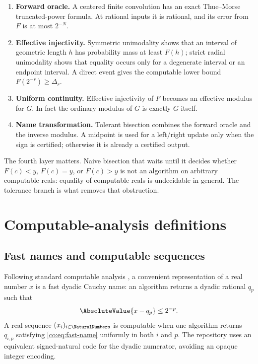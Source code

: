 \begin{enumerate}
\item \textbf{Forward oracle.}  A centered finite convolution has an exact
Thue--Morse truncated-power formula.  At rational inputs it is rational, and
its error from $F$ is at most $2^{-N}$.
\item \textbf{Effective injectivity.}  Symmetric unimodality shows that an
interval of geometric length $h$ has probability mass at least $F(h)$;
strict radial unimodality shows that equality occurs only for a degenerate
interval or an endpoint interval.
A direct event gives the computable lower bound $F(2^{-r})\ge\Delta_r$.
\item \textbf{Uniform continuity.}  Effective injectivity of $F$ becomes an
effective modulus for $G$.  In fact the ordinary modulus of $G$ is exactly
$G$ itself.
\item \textbf{Name transformation.}  Tolerant bisection combines the forward
oracle and the inverse modulus.  A midpoint is used for a left/right update
only when the sign is certified; otherwise it is already a certified output.
\end{enumerate}

The fourth layer matters.  Naive bisection that waits until it decides whether
$F(c)<y$, $F(c)=y$, or $F(c)>y$ is not an algorithm on arbitrary computable
reals: equality of computable reals is undecidable in general.  The tolerance
branch is what removes that obstruction.

\section{Computable-analysis definitions}

\subsection{Fast names and computable sequences}

Following standard computable analysis \cite{co:G1957,co:Weihrauch2000,co:PourElRichards1989}, a convenient representation of a real number $x$ is a fast dyadic Cauchy
name: an algorithm returns a dyadic rational $q_p$ such that
\begin{equation}\label{co:eq:fast-name}
 \AbsoluteValue{x-q_p}\le2^{-p}.
\end{equation}
A real sequence $(x_i)_{i\in\NaturalNumbers}$ is computable when one algorithm returns
$q_{i,p}$ satisfying \eqref{co:eq:fast-name} uniformly in both $i$ and $p$.
The repository uses an equivalent signed-natural code for the dyadic
numerator, avoiding an opaque integer encoding.

